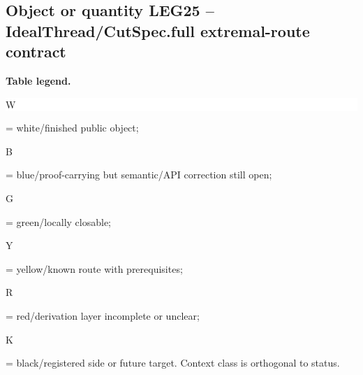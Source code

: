 \subsection*{Object or quantity LEG25 -- IdealThread/\allowbreak{}CutSpec.full extremal-route contract}
\hypertarget{objproof:LEG25}{}
\par\smallskip\noindent\begin{minipage}{0.99\linewidth}\footnotesize\raggedright\textbf{Table legend.} \colorbox{white}{\strut W} = white/finished public object; \colorbox{cyan!20}{\strut B} = blue/proof-carrying but semantic/API correction still open; \colorbox{green!18}{\strut G} = green/locally closable; \colorbox{yellow!25}{\strut Y} = yellow/known route with prerequisites; \colorbox{red!20}{\strut R} = red/derivation layer incomplete or unclear; \colorbox{black!18}{\strut K} = black/registered side or future target. Context class is orthogonal to status.\end{minipage}\par\vspace{0.25em}
